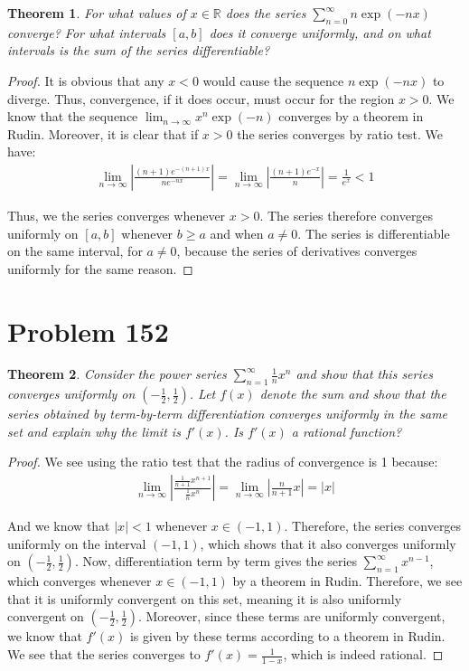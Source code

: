 \documentclass[psamsfonts]{amsart}
\newtheorem{thm}{Theorem}[section]
\theoremstyle{definition}
\theoremstyle{remark}
\numberwithin{equation}{section}
\begin{document}
\begin{thm}
For what values of $x \in \mathbb{R}$ does the series $\sum_{n=0}^\infty n \exp(-nx)$ converge? For what intervals $[a,b]$ does it converge uniformly, and on what intervals is the sum of the series differentiable?
\end{thm}

\begin{proof}
It is obvious that any $x < 0$ would cause the sequence $n \exp(-nx)$ to diverge. Thus, convergence, if it does occur, must occur for the region $x > 0$. We know that the sequence $\lim_{n \to \infty} x^n \exp(-n)$ converges by a theorem in Rudin. Moreover, it is clear that if $x >0$ the series converges by ratio test. We have: 
\begin{eqnarray}
\lim_{n \to \infty} \left| \frac{(n+1) e^{-(n+1)x}}{n e^{-nx}} \right| = \lim_{n \to \infty} \left| \frac{(n+1) e^{-x}}{n} \right| = \frac{1}{e^{x}} < 1
\end{eqnarray}

Thus, we the series converges whenever $x > 0$. The series therefore converges uniformly on $[a,b]$ whenever $b \geq a$ and when $a \neq 0$. The series is differentiable on the same interval, for $a \neq 0$, because the series of derivatives converges uniformly for the same reason. 
\end{proof}

\section{Problem 152}

\begin{thm}
Consider the power series $\sum_{n=1}^\infty \frac{1}{n} x^n$ and show that this series converges uniformly on $(-\frac{1}{2}, \frac{1}{2})$. Let $f(x)$ denote the sum and show that the series obtained by term-by-term differentiation converges uniformly in the same set and explain why the limit is $f'(x)$. Is $f'(x)$ a rational function?
\end{thm}

\begin{proof}
We see using the ratio test that the radius of convergence is 1 because:
\begin{eqnarray}
\lim_{n \to \infty} \left| \frac{\frac{1}{n+1} x^{n+1}}{\frac{1}{n} x^n } \right| = \lim_{n \to \infty} \left| \frac{n}{n+1} x \right| = |x|
\end{eqnarray}

And we know that $|x| < 1$ whenever $x \in (-1,1)$. Therefore, the series converges uniformly on the interval $(-1,1)$, which shows that it also converges uniformly on $(-\frac{1}{2}, \frac{1}{2})$. Now, differentiation term by term gives the series $\sum_{n=1}^\infty x^{n-1}$, which converges whenever $x \in (-1,1)$ by a theorem in Rudin. Therefore, we see that it is uniformly convergent on this set, meaning it is also uniformly convergent on $(-\frac{1}{2}, \frac{1}{2})$. Moreover, since these terms are uniformly convergent, we know that $f'(x)$ is given by these terms according to a theorem in Rudin. We see that the series converges to $f'(x) = \frac{1}{1-x}$, which is indeed rational.
\end{proof}
\end{document}
